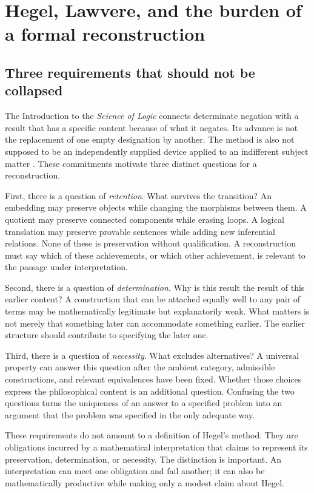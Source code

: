 \section{Hegel, Lawvere, and the burden of a formal reconstruction}
\label{sec:philosophy}

\subsection{Three requirements that should not be collapsed}

The Introduction to the \emph{Science of Logic} connects determinate negation
with a result that has a specific content because of what it negates. Its
advance is not the replacement of one empty designation by another. The
method is also not supposed to be an independently supplied device applied
to an indifferent subject matter \cite{HegelIntro}. These commitments motivate
three distinct questions for a reconstruction.

First, there is a question of \emph{retention}. What survives the transition?
An embedding may preserve objects while changing the morphisms between them.
A quotient may preserve connected components while erasing loops. A logical
translation may preserve provable sentences while adding new inferential
relations. None of these is preservation without qualification. A reconstruction
must say which of these achievements, or which other achievement, is relevant
to the passage under interpretation.

Second, there is a question of \emph{determination}. Why is this result the
result of this earlier content? A construction that can be attached equally
well to any pair of terms may be mathematically legitimate but explanatorily
weak. What matters is not merely that something later can accommodate
something earlier. The earlier structure should contribute to specifying the
later one.

Third, there is a question of \emph{necessity}. What excludes alternatives?
A universal property can answer this question after the ambient category,
admissible constructions, and relevant equivalences have been fixed. Whether
those choices express the philosophical content is an additional question.
Confusing the two questions turns the uniqueness of an answer to a specified
problem into an argument that the problem was specified in the only adequate
way.

These requirements do not amount to a definition of Hegel's method. They
are obligations incurred by a mathematical interpretation that claims to
represent its preservation, determination, or necessity. The distinction is
important. An interpretation can meet one obligation and fail another; it can
also be mathematically productive while making only a modest claim about
Hegel.

